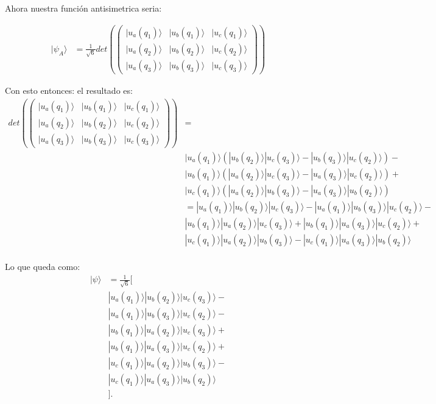 \documentclass{report}
\begin{document}
Ahora nuestra función antisimetrica seria:

\begin{align*}
  | \psi_A \rangle &= \frac{1}{\sqrt{6}} det\left(
  \begin{pmatrix}
    | u_a (q_1) \rangle & | u_b (q_1) \rangle & | u_c (q_1) \rangle\\
    | u_a (q_2) \rangle & | u_b (q_2) \rangle & | u_c (q_2) \rangle\\
    | u_a (q_3) \rangle & | u_b (q_3) \rangle & | u_c (q_3) \rangle
    \end{pmatrix}
  \right)
\end{align*}

Con esto entonces: el resultado es:
\begin{align*}
  det\left(
  \begin{pmatrix}
    | u_a (q_1) \rangle & | u_b (q_1) \rangle & | u_c (q_1) \rangle\\
    | u_a (q_2) \rangle & | u_b (q_2) \rangle & | u_c (q_2) \rangle\\
    | u_a (q_3) \rangle & | u_b (q_3) \rangle & | u_c (q_3) \rangle
    \end{pmatrix}
  \right) &=\\
  & | u_a (q_1)\rangle \left( | u_b (q_2) \rangle | u_c (q_3) \rangle - | u_b (q_3) \rangle | u_c (q_2) \rangle\right)-\\
  & | u_b (q_1)\rangle \left( | u_a (q_2) \rangle | u_c (q_3) \rangle - | u_a (q_3) \rangle | u_c (q_2) \rangle\right)+\\
  & | u_c (q_1)\rangle \left( | u_a (q_2) \rangle | u_b (q_3) \rangle - | u_a (q_3) \rangle | u_b (q_2) \rangle\right)\\
  &=
  | u_a (q_1)\rangle | u_b (q_2) \rangle | u_c (q_3) \rangle - | u_a (q_1) \rangle | u_b (q_3) \rangle | u_c (q_2) \rangle -\\
  & | u_b (q_1)\rangle | u_a (q_2) \rangle | u_c (q_3) \rangle + | u_b (q_1)\rangle | u_a (q_3) \rangle | u_c (q_2) \rangle +\\
  & | u_c (q_1)\rangle | u_a (q_2) \rangle | u_b (q_3) \rangle - | u_c (q_1)\rangle| u_a (q_3) \rangle | u_b (q_2) \rangle\\
\end{align*}

Lo que queda como:
\begin{align*}
  | \psi \rangle &= \frac{1}{\sqrt{6}} [\\
  & | u_a (q_1)\rangle | u_b (q_2) \rangle | u_c (q_3) \rangle -\\
  &| u_a (q_1) \rangle | u_b (q_3) \rangle | u_c (q_2) \rangle -\\
  & | u_b (q_1)\rangle | u_a (q_2) \rangle | u_c (q_3) \rangle +\\
  &| u_b (q_1)\rangle | u_a (q_3) \rangle | u_c (q_2) \rangle +\\
  & | u_c (q_1)\rangle | u_a (q_2) \rangle | u_b (q_3) \rangle -\\
  &| u_c (q_1)\rangle| u_a (q_3) \rangle | u_b (q_2) \rangle\\
    &].\\
\end{align*}
\end{document}
